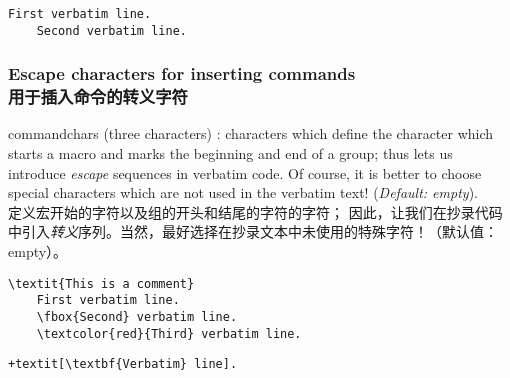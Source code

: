 \documentclass[twoside]{article}
\providecommand\optname[1]{\textsf{#1}}
\newenvironment{optlist}{\begin{description}%
  \renewcommand\makelabel[1]{%
    \descriptionlabel{\mdseries\optname{##1}}}%
  \itemsep0.25\itemsep}%
 {\end{description}}
\begin{document}
\begin{SideBySideExample}
  \begin{Verbatim}[baselinestretch=2]
    First verbatim line.
    Second verbatim line.
  \end{Verbatim}
\end{SideBySideExample}

\subsubsection{Escape characters for inserting commands\\用于插入命令的转义字符}


\begin{optlist}
  \item[commandchars (three characters)]: characters which define the
  character which starts a macro and marks the beginning and end of a group;
  thus lets us introduce \emph{escape} sequences in verbatim code. Of
  course, it is better to choose special characters which are not used in
  the verbatim text! (\emph{Default: empty}).
\\定义宏开始的字符以及组的开头和结尾的字符的字符；
因此，让我们在抄录代码中引入\emph{转义}序列。当然，最好选择在抄录文本中未使用的特殊字符！（默认值：empty）。
  \label{sec:commandchars}
\end{optlist}

\begin{SideBySideExample}
  \begin{Verbatim}[commandchars=\\\{\}]
    \textit{This is a comment}
    First verbatim line.
    \fbox{Second} verbatim line.
    \textcolor{red}{Third} verbatim line.
  \end{Verbatim}

  \begin{Verbatim}[commandchars=+\[\]]
    +textit[\textbf{Verbatim} line].
  \end{Verbatim}
\end{SideBySideExample}
\end{document}
